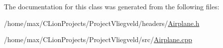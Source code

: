 The documentation for this class was generated from the following files\+:\begin{DoxyCompactItemize}
\item 
/home/max/\+C\+Lion\+Projects/\+Project\+Vliegveld/headers/\hyperlink{Airplane_8h}{Airplane.\+h}\item 
/home/max/\+C\+Lion\+Projects/\+Project\+Vliegveld/src/\hyperlink{Airplane_8cpp}{Airplane.\+cpp}\end{DoxyCompactItemize}
